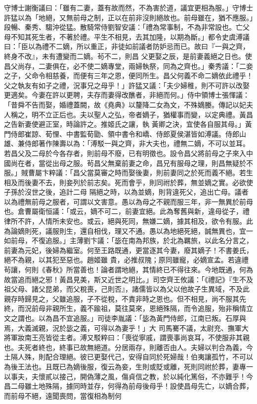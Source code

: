 \begin{pinyinscope}
 守博士謝衡議曰：「雖有二妻，蓋有故而然，不為害於道，議宜更相為服。」守博士許猛以為「地絕，又無前母之制，正以在前非沒則絕故也。前母雖在，猶不應服。」段暢、秦秀、騶沖從猛。散騎常侍劉智安議：「禮為常事制，不為非常設也。亡父母不知其死生者，不著於禮。平生不相見，去其加隆，以期為斷。」都令史虞溥議曰：「臣以為禮不二嫡，所以重正，非徒如前議者防妒忌而已。故曰『一與之齊，終身不改』，未有遭變而二嫡。茍不二，則昌
 父更娶之辰，是前妻義絕之日也。使昌父尚存，二妻俱在，必不使二嫡專堂，兩婦執祭，同為之齊也。」秦秀議：「二妾之子，父命令相慈養，而便有三年之恩，便同所生。昌父何義不命二嫡依此禮乎！父之執友有如子之禮，況事兄之母乎！」許猛又議：「夫少婦稚，則不可許以改娶更適矣。今妻在許以更聘，夫存而妻得改醮者，非絕而何。」侍中領博士張惲議：「昔舜不告而娶，婚禮蓋闕，故《堯典》以釐降二女為文，不殊嫡媵。傳記以妃夫人稱之，明不立正后也。夫以聖人之弘，帝者嫡子，猶權事而變，以定典禮。黃昌之告新妻使避正室，時論許之。推姬氏之讓，執
 黃卿之決，宜使各自服其母。」黃門侍郎崔諒、荀悝、中書監荀勖、領中書令和嶠、侍郎夏侯湛皆如溥議。侍郎山雄、兼侍郎著作陳壽以為：「溥駁一與之齊，非大夫也，禮無二嫡，不可以並耳。若昌父及二母於今各存者，則前母不廢，已有明徵也。設令昌父將前母之子來入中國尚在者，當從出母之服。茍昌父無棄前妻之命，昌兄有服母之理，則昌無疑於不服。」賊曹屬卞粹議：「昌父當莫審之時而娶後妻，則前妻同之於死而義不絕。若生相及而後妻不去，則妾列於前志矣。死而會乎，則同祔於葬，無並嫡之實。必欲使子孫於沒世之後，追計二母
 隔絕之時，以為並嫡，則背違死父，追出亡母。議者以為禮無前母之服者，可謂以文害意。愚以為母之不親而服三年，非一無異於前母也。倉曹屬衛恒議：「或云，嫡不可二，前妻宜絕。此為奪舊與新，違母從子，禮律所不許，人情所未安也。或云，絕與死同，無嫌二嫡，據其相及，欲令有服。此為論嫡則死，議服則生，還自相伐，理又不通。愚以為地絕死絕，誠無異也，宜一如前母，不復追服。」主薄劉卞議：「毖在南為邦族，於北為羈旅，以此名分言之，前妻為元妃，後婦為繼室。何至王路既通，更當逐其今妻，廢其嫡子！不書姜氏，絕不為親，以其犯至惡也。趙姬雖
 貴，必推叔隗；原同雖寵，必嫡宣孟。若違禮茍讓，何則《春秋》所當善也！論者謂地絕，其情終已不得往來。今地既通，何為故當追而絕之邪！黃昌見美，斯又近世之明比。」司空齊王攸議：「《禮記》『生不及祖父母、諸父昆弟，而父稅喪，己則否』，諸儒皆以為父以他故子生異域，不及此親存時歸見之，父雖追服，子不從稅，不責非時之恩也。但不相見，尚不服其先終，而況前母非親所生，義不踰祖，莫往莫來，恩絕殊隔，而令追服，殆非稱情立文之謂也。以為昌不宜追服。」司徒李胤議：「毖為黃門侍郎，江南已叛。石厚與焉，大義滅親，況於毖之義，可得以為妻乎！」大
 司馬騫不議，太尉充、撫軍大將軍妝南王亮皆從主者。溥又駁粹曰：「喪從寧戚，謂喪事尚哀耳，不使服非其親也。夫死者終也，終事已故無絕道。分居兩存，則離否由人。夫婦以判合為義，今土隔人殊，則配合理絕。彼已更娶代己，安得自同於死婦哉！伯夷讓孤竹，不可以為後王法也。且既已為嫡後服，復云為妾，生則或貶或離，死則同祔於葬，妻專一以事夫，夫懷貳以接己，開偽薄之風，傷貞信之教，於以純化篤俗，不亦難乎！今昌二母雖土地殊隔，據同時並存，何得為前母後母乎！設使昌母先亡，以嫡合葬，而前母不絕，遠聞喪問，當復相為制何

\end{pinyinscope}
